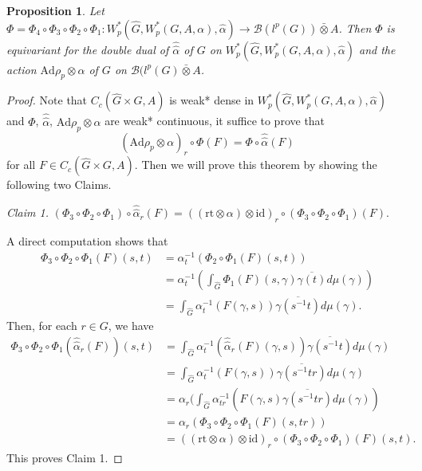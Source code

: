 \documentclass[reqno,11pt]{amsart}
\theoremstyle{plain}
\newtheorem{prop}[thm]{Proposition}
\theoremstyle{definition}
\theoremstyle{remark}
\begin{document}
\begin{prop}\label{equi}
Let $\Phi=\Phi_4\circ\Phi_3\circ\Phi_2\circ\Phi_1:W^*_p(\hat{G},W^*_p(G,A,\alpha),\hat{\alpha})\rightarrow \mathcal{B}(l^p(G))\bar{\otimes}A$. Then $\Phi$ is equivariant for the double dual of $\hat{\hat{\alpha}}$ of $G$ on $W^*_p(\hat{G},W^*_p(G,A,\alpha),\hat{\alpha})$ and the action $\mathrm{Ad}\rho_p\otimes\alpha$ of $G$ on $\mathcal{B}(l^p(G)\bar{\otimes}A$.
\end{prop}
\begin{proof}
Note that $C_c(\hat{G}\times G,A)$ is weak* dense in $W^*_p(\hat{G},W^*_p(G,A,\alpha),\hat{\alpha})$ and $\Phi$, $\hat{\hat{\alpha}}$, $\mathrm{Ad}\rho_p\otimes\alpha$ are weak* continuous, it suffice to prove that $$(\mathrm{Ad}\rho_p\otimes\alpha)_r\circ\Phi(F)=\Phi\circ\hat{\hat{\alpha}}(F)$$ for all $F\in C_c(\hat{G}\times G,A)$. Then we will prove this theorem by showing the following two Claims.

{\it Claim 1.} $(\Phi_{3}\circ \Phi_{2}\circ \Phi_{1})\circ \hat{\hat{\alpha}}_{r}(F)=((\mathrm{rt}\otimes\alpha)\otimes \mathrm{id})_{r}\circ (\Phi_{3}\circ \Phi_{2}\circ \Phi_{1})(F)$.

A direct computation shows that
$$\begin{aligned} \Phi_{3}\circ \Phi_{2}\circ \Phi_{1}(F)(s,t)&= \alpha_{t}^{-1}(\Phi_{2}\circ \Phi_{1}(F)(s,t))\\
&=\alpha_{t}^{-1}(\int_{\hat{G}}\Phi_{1}(F)(s,\gamma)\overline{\gamma(t)}d\mu(\gamma))\\
&=\int_{\hat{G}}\alpha_{t}^{-1}(F(\gamma,s))\overline{\gamma(s^{-1}t)}d\mu(\gamma). \end{aligned}$$
Then, for each $r\in G$, we have
$$\begin{aligned} \Phi_{3}\circ \Phi_{2}\circ \Phi_{1}(\hat{\hat{\alpha}}_{r}(F))(s,t)&= \int_{\hat{G}}\alpha_{t}^{-1}(\hat{\hat{\alpha}}_{r}(F)(\gamma,s))\overline{\gamma(s^{-1}t)}d\mu(\gamma)\\
&=\int_{\hat{G}}\alpha_{t}^{-1}(F(\gamma,s))\overline{\gamma(s^{-1}tr)}d\mu(\gamma)\\
&=\alpha_{r}(\int_{\hat{G}} \alpha_{tr}^{-1}(F(\gamma,s)\overline{\gamma(s^{-1}tr)}d\mu(\gamma))\\
&=\alpha_{r}(\Phi_{3}\circ \Phi_{2}\circ \Phi_{1}(F)(s,tr))\\
&=((\mathrm{rt}\otimes\alpha)\otimes \mathrm{id})_{r}\circ (\Phi_{3}\circ \Phi_{2}\circ \Phi_{1})(F)(s,t). \end{aligned}$$
This proves Claim 1.


\end{proof}
\end{document}
